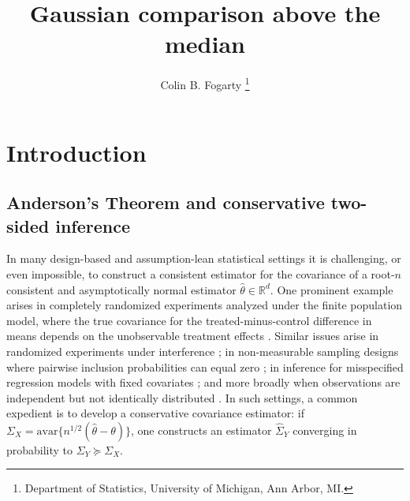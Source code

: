 \documentclass[11pt]{article}
\title{Gaussian comparison above the median}
\author{Colin B. Fogarty \thanks{Department of Statistics, University of Michigan, Ann Arbor, MI.}}
\date{}
\newcommand{\1}{\mathbbm{1}}
\theoremstyle{plain}
\theoremstyle{definition}
\begin{document}
\thispagestyle{empty}
\maketitle
{}
\normalsize
\singlespacing
\section{Introduction}
\subsection{Anderson's Theorem and conservative two-sided inference}

In many design-based and assumption-lean statistical settings it is challenging, or even impossible, to construct a consistent estimator for the covariance of a root-$n$ consistent and asymptotically normal estimator $\hat{\theta} \in \mathbb{R}^d$. One prominent example arises in completely randomized experiments analyzed under the finite population model, where the true covariance for the treated-minus-control difference in means depends on the unobservable treatment effects \citep{ney23, li17, aba20}. Similar issues arise in randomized experiments under interference \citep{har26}; in non-measurable sampling designs where pairwise inclusion probabilities can equal zero \citep[p. 33]{aro13conservative, sar92}; in inference for misspecified regression models with fixed covariates \citep{aba14}; and more broadly when observations are independent but not identically distributed \citep{liu95}. In such settings, a common expedient is to develop a {conservative} covariance estimator: if $\Sigma_X = \text{avar}\{n^{1/2}(\hat{\theta}-\theta)\}$, one constructs an estimator $\hat{\Sigma}_Y$ converging in probability to $\Sigma_Y \succeq \Sigma_X$. 
\end{document}

